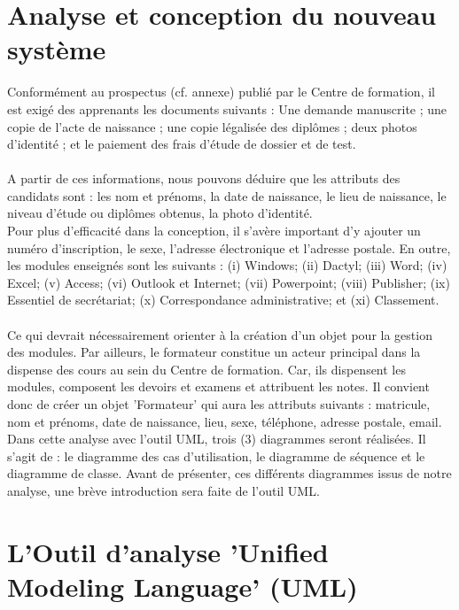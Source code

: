 \section{Analyse et conception du nouveau système}

Conformément au prospectus (cf. annexe) publié par le Centre de formation, il est exigé des apprenants les documents suivants :
Une demande manuscrite ; une copie de l'acte de naissance ; une copie légalisée des diplômes ; deux photos d'identité ; et le paiement des frais d'étude de dossier et de test.
\paragraph{}
A partir de ces informations, nous pouvons déduire que les attributs des candidats sont : les nom et prénoms, la date de naissance, le lieu de naissance, le niveau d'étude ou diplômes obtenus, la photo d'identité.
\\
Pour plus d'efficacité dans la conception, il s'avère important d'y ajouter un numéro d'inscription, le sexe, l'adresse électronique et l'adresse postale.
En outre, les modules enseignés sont les suivants :
(i) Windows; (ii) Dactyl; (iii) Word; (iv) Excel; (v) Access; (vi) Outlook et Internet; (vii) Powerpoint; (viii) Publisher; (ix) Essentiel de secrétariat; (x) Correspondance administrative; et (xi) Classement. 
 
\paragraph{}
Ce qui devrait nécessairement orienter à la création d’un objet pour la gestion des modules.
Par ailleurs, le formateur constitue un acteur principal dans la dispense des cours au sein du Centre de formation. Car, ils dispensent les modules, composent les devoirs et examens et attribuent les notes. Il convient donc de créer un objet 'Formateur' qui aura les attributs suivants : matricule, nom et prénoms, date de naissance, lieu, sexe, téléphone, adresse postale, email.
Dans cette analyse avec l'outil UML, trois (3) diagrammes seront réalisées. Il s'agit de : le diagramme des cas d'utilisation, le diagramme de séquence et le diagramme de classe. Avant de présenter, ces différents diagrammes issus de notre analyse, une brève introduction sera faite de l’outil UML.
\section{L'Outil d'analyse 'Unified Modeling Language' (UML)}

